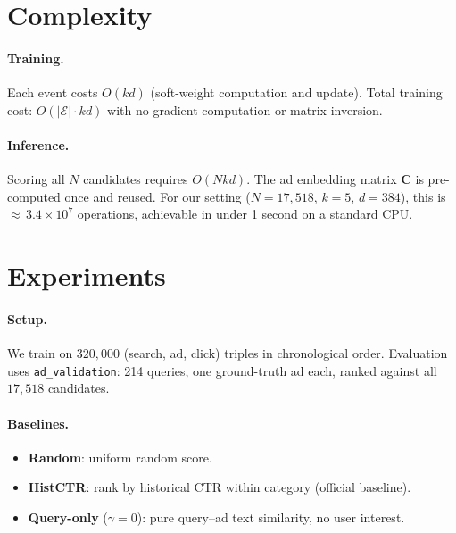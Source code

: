 \documentclass[10pt,twocolumn]{article}
\begin{document}
\section{Complexity}
\label{sec:complexity}

\paragraph{Training.}
Each event costs $O(kd)$ (soft-weight computation and update).
Total training cost: $O(|\mathcal{E}| \cdot kd)$ with no gradient
computation or matrix inversion.

\paragraph{Inference.}
Scoring all $N$ candidates requires $O(Nkd)$.
The ad embedding matrix $\bm{C}$ is pre-computed once and reused.
For our setting ($N\!=\!17{,}518$, $k\!=\!5$, $d\!=\!384$),
this is ${\approx}\,3.4 \times 10^7$ operations,
achievable in under 1 second on a standard CPU.

\section{Experiments}
\label{sec:results}

\paragraph{Setup.}
We train on $320{,}000$ (search, ad, click) triples in chronological order.
Evaluation uses \texttt{ad\_validation}: 214 queries, one ground-truth
ad each, ranked against all $17{,}518$ candidates.

\paragraph{Baselines.}
\begin{itemize}[leftmargin=*,nosep,itemsep=1pt]
  \item \textbf{Random}: uniform random score.
  \item \textbf{HistCTR}: rank by historical CTR within category
    (official baseline).
  \item \textbf{Query-only} ($\gamma\!=\!0$): pure query--ad text
    similarity, no user interest.
\end{itemize}
\end{document}
